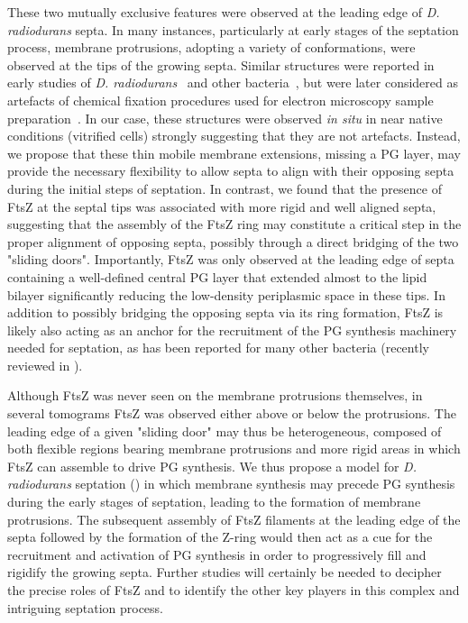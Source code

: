 These two mutually exclusive features were observed at the leading edge of \textit{D. radiodurans} septa.
In many instances, particularly at early stages of the septation process, membrane protrusions, adopting a variety of conformations, were observed at the tips of the growing septa.
Similar structures were reported in early studies of \textit{D. radiodurans}~\cite{thornleyFineStructureMicrococcus1965,sleytrStudyFreezeetchingFine1973} and other bacteria~\cite{suganumaStudiesFineStructure1966,pontefractMesosomesEscherichiaColi1969}, but were later considered as artefacts of chemical fixation procedures used for electron microscopy sample preparation~\cite{ryterContributionNewCryomethods1988,dubochetElectronMicroscopyFrozenhydrated1983,liedtkeHowAdvancesCryoelectron2022}.
In our case, these structures were observed \textit{in situ} in near native conditions (vitrified cells) strongly suggesting that they are not artefacts.
Instead, we propose that these thin mobile membrane extensions, missing a PG layer, may provide the necessary flexibility to allow septa to align with their opposing septa during the initial steps of septation.
In contrast, we found that the presence of FtsZ at the septal tips was associated with more rigid and well aligned septa, suggesting that the assembly of the FtsZ ring may constitute a critical step in the proper alignment of opposing septa, possibly through a direct bridging of the two "sliding doors".
Importantly, FtsZ was only observed at the leading edge of septa containing a well-defined central PG layer that extended almost to the lipid bilayer significantly reducing the low-density periplasmic space in these tips.
In addition to possibly bridging the opposing septa via its ring formation, FtsZ is likely also acting as an anchor for the recruitment of the PG synthesis machinery needed for septation, as has been reported for many other bacteria (recently reviewed in \citet{barrowsFtsZDynamicsBacterial2021,mcquillenInsightsStructureFunction2020,cameronInsightsAssemblyRegulation2024}).

Although FtsZ was never seen on the membrane protrusions themselves, in several tomograms FtsZ was observed either above or below the protrusions.
The leading edge of a given "sliding door" may thus be heterogeneous, composed of both flexible regions bearing membrane protrusions and more rigid areas in which FtsZ can assemble to drive PG synthesis.
We thus propose a model for \textit{D. radiodurans} septation () in which membrane synthesis may precede PG synthesis during the early stages of septation, leading to the formation of membrane protrusions.
The subsequent assembly of FtsZ filaments at the leading edge of the septa followed by the formation of the Z-ring would then act as a cue for the recruitment and activation of PG synthesis in order to progressively fill and rigidify the growing septa.
Further studies will certainly be needed to decipher the precise roles of FtsZ and to identify the other key players in this complex and intriguing septation process.


